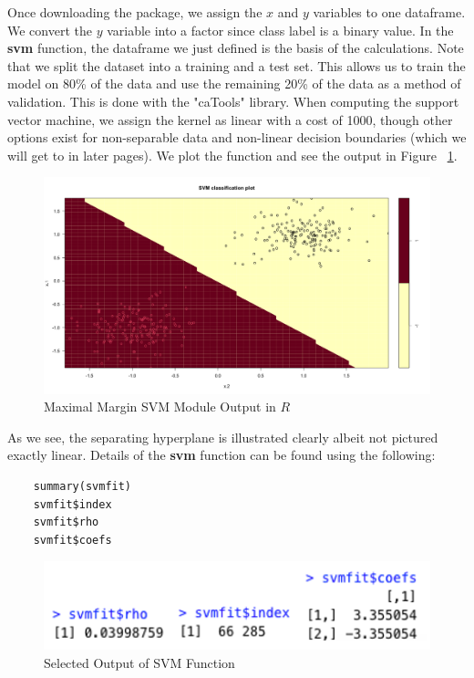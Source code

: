 \documentclass[12pt]{article}
\begin{document}
Once downloading the package, we assign the $x$ and $y$ variables to one dataframe. We convert the $y$ variable into a factor since class label is a binary value. In the \textbf{svm} function, the dataframe we just defined is the basis of the calculations. Note that we split the dataset into a training and a test set. This allows us to train the model on 80\% of the data and use the remaining 20\% of the data as a method of validation. This is done with the "caTools" library. When computing the support vector machine, we assign the kernel as linear with a cost of 1000, though other options exist for non-separable data and non-linear decision boundaries (which we will get to in later pages). We plot the function and see the output in Figure ~\ref{fig_mmc_module_output}.

\begin{figure}
    \centering
    \includegraphics[width=5.5in]{Figures/mmc/mmc_module_output.png}
    \caption{Maximal Margin SVM Module Output in $R$}
    \label{fig_mmc_module_output}
\end{figure}
As we see, the separating hyperplane is illustrated clearly albeit not pictured exactly linear. Details of the \textbf{svm} function can be found using the following:
\begin{verbatim}
    summary(svmfit)
    svmfit$index
    svmfit$rho
    svmfit$coefs
\end{verbatim}

\begin{figure}[ht]
    \centering
    \includegraphics[width=5in]{Figures/mmc/mmc_selected_output.png}
    \caption{Selected Output of SVM Function}
    \label{fig_mmc_selected_output}
\end{figure}
\end{document}
